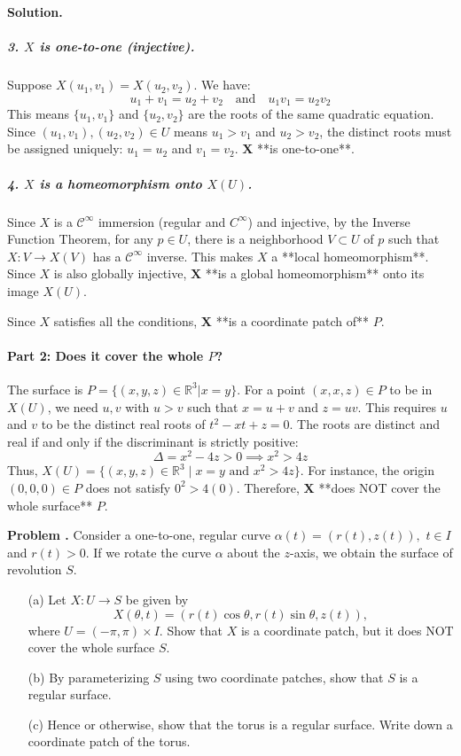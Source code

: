 \documentclass[12pt, a4paper, oneside]{article}
\newcounter{problemname}
\newenvironment{problems}
  {\begin{shaded}\stepcounter{problemname}\par\noindent\textbf{Problem \arabic{problemname}. }\newline}
  {\end{shaded}\par}
\newenvironment{solution}
  {\par\noindent\textbf{Solution. }\newline}
  {\par}
\begin{document}
\begin{solution}
\subparagraph{3. $X$ is one-to-one (injective).}
Suppose $X(u_1, v_1) = X(u_2, v_2)$. We have:
$$
u_1+v_1 = u_2+v_2 \quad \text{and} \quad u_1v_1 = u_2v_2
$$
This means $\{u_1, v_1\}$ and $\{u_2, v_2\}$ are the roots of the same quadratic equation. Since $(u_1, v_1), (u_2, v_2) \in U$ means $u_1>v_1$ and $u_2>v_2$, the distinct roots must be assigned uniquely: $u_1=u_2$ and $v_1=v_2$. $\mathbf{X}$ **is one-to-one**.

\subparagraph{4. $X$ is a homeomorphism onto $X(U)$.}
Since $X$ is a $\mathcal{C}^\infty$ immersion (regular and $C^\infty$) and injective, by the Inverse Function Theorem, for any $p \in U$, there is a neighborhood $V \subset U$ of $p$ such that $X: V \to X(V)$ has a $\mathcal{C}^\infty$ inverse. This makes $X$ a **local homeomorphism**. Since $X$ is also globally injective, $\mathbf{X}$ **is a global homeomorphism** onto its image $X(U)$.

Since $X$ satisfies all the conditions, $\mathbf{X}$ **is a coordinate patch of** $P$.

\paragraph{Part 2: Does it cover the whole $P$?}
The surface is $P=\{(x,y,z) \in \mathbb{R}^{3}|x=y\}$.
For a point $(x,x,z) \in P$ to be in $X(U)$, we need $u,v$ with $u>v$ such that $x=u+v$ and $z=uv$.
This requires $u$ and $v$ to be the distinct real roots of $t^2 - xt + z = 0$.
The roots are distinct and real if and only if the discriminant is strictly positive:
$$
\Delta = x^2 - 4z > 0 \implies x^2 > 4z
$$
Thus, $X(U) = \{(x,y,z) \in \mathbb{R}^{3} \mid x=y \text{ and } x^2 > 4z\}$.
For instance, the origin $(0,0,0) \in P$ does not satisfy $0^2 > 4(0)$.
Therefore, $\mathbf{X}$ **does NOT cover the whole surface** $P$.
\end{solution}

\begin{problems}
Consider a one-to-one, regular curve $\alpha(t)=(r(t),z(t)),$ $t\in I$ and $r(t)>0$. If we rotate the curve $\alpha$ about the $z$-axis, we obtain the surface of revolution $S$.
\begin{enumerate}
    \item[(a)] Let $X: U \rightarrow S$ be given by
    $$X(\theta,t)=(r(t)\cos\theta, r(t)\sin\theta, z(t)),$$
    where $U=(-\pi,\pi)\times I.$ Show that $X$ is a coordinate patch, but it does NOT cover the whole surface $S$.

    \item[(b)] By parameterizing $S$ using two coordinate patches, show that $S$ is a regular surface.

    \item[(c)] Hence or otherwise, show that the torus is a regular surface. Write down a coordinate patch of the torus.
\end{enumerate}
\end{problems}
\end{document}
